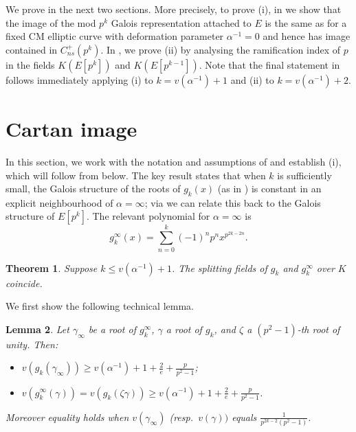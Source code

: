 \documentclass{amsart}
\newtheorem{theorem}{Theorem}
\newtheorem{lemma}[theorem]{Lemma}
\theoremstyle{definition}
\numberwithin{theorem}{section}
\numberwithin{equation}{section}
\begin{document}
We prove  in the next two sections. More precisely, to prove (i), in  we show that the image of the mod $p^k$ Galois representation attached to $E$ is the same as for a fixed CM elliptic curve with deformation parameter $\alpha^{-1}=0$ and hence has image contained in $C_{ns}^+(p^k)$. In , we prove (ii) by analysing the ramification index of $p$ in the fields $K(E[p^k])$ and $K(E[p^{k-1}])$. Note that the final statement in  follows immediately applying (i) to $k=v(\alpha^{-1})+1$ and (ii) to $k=v(\alpha^{-1})+2$.


\section{Cartan image}\label{sect: large valuation}

In this section, we work with the notation and assumptions of  and establish (i), 
which will follow from  below.
The key result states that when $k$ is sufficiently small, the Galois structure of the roots of $g_k(x)$ (as in ) is constant in an explicit neighbourhood of $\alpha=\infty$; via  we can relate this back to the Galois structure of $E[p^k]$. The relevant polynomial for $\alpha=\infty$ is 
\[
g_k^{\infty}(x) = \sum_{n=0}^{k} (-1)^np^n x^{p^{2k-2n}}.
\]

\begin{theorem}\label{thm: technical result for large valuation}
Suppose $k \leq v(\alpha^{-1}) +1$. The splitting fields of $g_k$ and $g_k^{\infty}$ over $K$ coincide.
\end{theorem}

We first show the following technical lemma.

\begin{lemma}\label{lemma: valuation of g(gamma) and h(beta)}
Let $\gamma_\infty$ be a root of $g_k^\infty$, $\gamma$ a root of $g_k$, and $\zeta$ a $(p^2-1)$-th root of unity. Then:
\begin{itemize}
    \item $v(g_k(\gamma_\infty)) \geq  v(\alpha^{-1}) +1 + \frac{2}{e} + \frac{p}{p^2-1}$;
    \item $v(g_k^\infty(\gamma)) = v(g_k(\zeta \gamma)) \geq  v(\alpha^{-1}) +1 + \frac{2}{e} + \frac{p}{p^2-1}$.
\end{itemize}
Moreover equality holds when $v(\gamma_\infty)$ (resp.~$v(\gamma))$ equals $\frac{1}{p^{2k-2}(p^2-1)}$.
\end{lemma}
\end{document}
